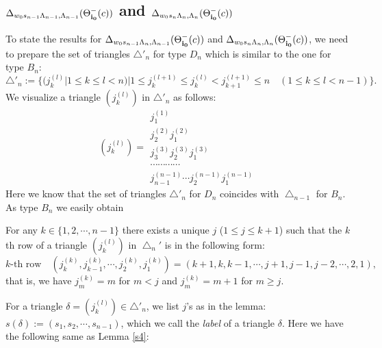 \subsection{${\Delta}_{w_0s_{n-1}{\Lambda}_{n-1},{\Lambda}_{n-1}}(\Theta^-_\bfii0(c))$ 
and ${\Delta}_{w_0s_n{\Lambda}_n,{\Lambda}_n}(\Theta^-_\bfii0(c))$}\label{Dn-del-n}
To state the results for 
${\Delta}_{w_0s_{n-1}{\Lambda}_n,{\Lambda}_{n-1}}(\Theta^-_\bfii0(c))$ and 
${\Delta}_{w_0s_n{\Lambda}_n,{\Lambda}_n}(\Theta^-_\bfii0(c))$,
we need to prepare the set of triangles ${\bigtriangleup}'_n$ for type $D_n$
which is similar to the one for type $B_n$:
\begin{equation}
{\bigtriangleup}'_n:=\{({j_{k}^{(l)}}|1\leq k\leq l<
n)|1\leq {j_{k}^{(l+1)}}\leq {j_{k}^{(l)}}<{j_{k+1}^{(l+1)}}\leq n
{\quad}(1\leq k\leq l<n-1)\}.
\end{equation}
We visualize a triangle $({j_{k}^{(l)}})$ in ${\bigtriangleup}'_n$ as follows:
\[({j_{k}^{(l)}})=
 \begin{array}{c}
{j_{1}^{(1)}}\\
{j_{2}^{(2)}}{j_{1}^{(2)}}\\
{j_{3}^{(3)}}{j_{2}^{(3)}}{j_{1}^{(3)}}\\
{\cdots}{\cdots}{\cdots}{\cdots}\\
{j_{n-1}^{(n-1)}}{\cdots}{j_{2}^{(n-1)}}{j_{1}^{(n-1)}}
\end{array}
\]
Here we know that the set of triangles ${\bigtriangleup}'_n$ for $D_n$
coincides with ${\bigtriangleup}_{n-1}$ for $B_n$.
As type $B_n$ we easily obtain 
\begin{lem}
For any $k\in\{1,2,{\cdots},n-1\}$ there exists a unique $j$
($1\leq j\leq k+1$) such that the $k$th row of 
a triangle $({j_{k}^{(l)}})$ in ${\bigtriangleup}_n'$ is in the following form:
\begin{equation}
k\text{-th row}{\quad}
({j_{k}^{(k)}},{j_{k-1}^{(k)}},{\cdots},{j_{2}^{(k)}},{j_{1}^{(k)}})
=(k+1, k,k-1,{\cdots},j+1,j-1,j-2,{\cdots},2,1),
\end{equation}
that is, we have ${j_{m}^{(k)}}=m$ for $m<j$ and 
${j_{m}^{(k)}}=m+1$ for $m\geq j$.
\end{lem}
For a triangle ${\delta}=({j_{k}^{(l)}})\in{\bigtriangleup}'_n$, we list $j$'s as in the lemma:
$s({\delta}):=(s_1,s_2,{\cdots},s_{n-1})$, 
which we call the {\it label} of a triangle ${\delta}$.
Here we have the following same as Lemma \ref{s4}:
